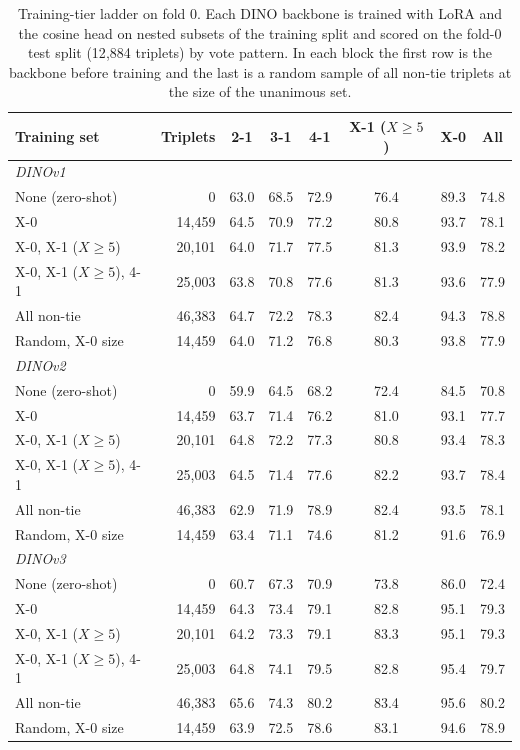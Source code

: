 \begin{table}[!ht]
\caption{Training-tier ladder on fold 0. Each DINO backbone is trained with LoRA and the cosine head on nested subsets of the training split and scored on the fold-0 test split (12{,}884 triplets) by vote pattern. In each block the first row is the backbone before training and the last is a random sample of all non-tie triplets at the size of the unanimous set.}
\label{tab:ladder}
\centering
\small
\begin{tabular}{lrcccccc}
\toprule
Training set & Triplets & 2-1 & 3-1 & 4-1 & X-1 ($X \geq 5$) & X-0 & All \\
\midrule
\multicolumn{8}{l}{\emph{DINOv1}} \\
None (zero-shot) & 0 & 63.0 & 68.5 & 72.9 & 76.4 & 89.3 & 74.8 \\
X-0 & 14{,}459 & 64.5 & 70.9 & 77.2 & 80.8 & 93.7 & 78.1 \\
X-0, X-1 ($X \geq 5$) & 20{,}101 & 64.0 & 71.7 & 77.5 & 81.3 & 93.9 & 78.2 \\
X-0, X-1 ($X \geq 5$), 4-1 & 25{,}003 & 63.8 & 70.8 & 77.6 & 81.3 & 93.6 & 77.9 \\
All non-tie & 46{,}383 & 64.7 & 72.2 & 78.3 & 82.4 & 94.3 & 78.8 \\
Random, X-0 size & 14{,}459 & 64.0 & 71.2 & 76.8 & 80.3 & 93.8 & 77.9 \\
\midrule
\multicolumn{8}{l}{\emph{DINOv2}} \\
None (zero-shot) & 0 & 59.9 & 64.5 & 68.2 & 72.4 & 84.5 & 70.8 \\
X-0 & 14{,}459 & 63.7 & 71.4 & 76.2 & 81.0 & 93.1 & 77.7 \\
X-0, X-1 ($X \geq 5$) & 20{,}101 & 64.8 & 72.2 & 77.3 & 80.8 & 93.4 & 78.3 \\
X-0, X-1 ($X \geq 5$), 4-1 & 25{,}003 & 64.5 & 71.4 & 77.6 & 82.2 & 93.7 & 78.4 \\
All non-tie & 46{,}383 & 62.9 & 71.9 & 78.9 & 82.4 & 93.5 & 78.1 \\
Random, X-0 size & 14{,}459 & 63.4 & 71.1 & 74.6 & 81.2 & 91.6 & 76.9 \\
\midrule
\multicolumn{8}{l}{\emph{DINOv3}} \\
None (zero-shot) & 0 & 60.7 & 67.3 & 70.9 & 73.8 & 86.0 & 72.4 \\
X-0 & 14{,}459 & 64.3 & 73.4 & 79.1 & 82.8 & 95.1 & 79.3 \\
X-0, X-1 ($X \geq 5$) & 20{,}101 & 64.2 & 73.3 & 79.1 & 83.3 & 95.1 & 79.3 \\
X-0, X-1 ($X \geq 5$), 4-1 & 25{,}003 & 64.8 & 74.1 & 79.5 & 82.8 & 95.4 & 79.7 \\
All non-tie & 46{,}383 & 65.6 & 74.3 & 80.2 & 83.4 & 95.6 & 80.2 \\
Random, X-0 size & 14{,}459 & 63.9 & 72.5 & 78.6 & 83.1 & 94.6 & 78.9 \\
\bottomrule
\end{tabular}
\end{table}


